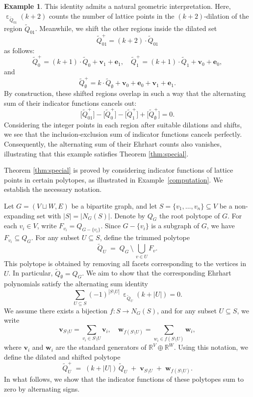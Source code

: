 \documentclass{amsart}
\theoremstyle{definition}
\newtheorem{example}[theorem]{Example}
\theoremstyle{remark}
\DeclareMathOperator{\ehr}{\varepsilon}
\numberwithin{equation}{section}
\begin{document}
\begin{example}
This identity admits a natural geometric interpretation. Here, $\ehr_{\widetilde{Q}_{01}}(k+2)$ counts the number of lattice points in the $(k+2)$-dilation of the region $\widetilde{Q}_{01}$. Meanwhile, we shift the other regions inside the dilated set
\[
\widetilde{Q}_{01}^+ = (k+2)\cdot\widetilde{Q}_{01}
\]
as follows:
\[
\widetilde{Q}_0^+ = (k+1)\cdot\widetilde{Q}_0 + \mathbf{v}_1 + \mathbf{e}_1,\quad
\widetilde{Q}_1^+ = (k+1)\cdot\widetilde{Q}_1 + \mathbf{v}_0 + \mathbf{e}_0,
\]
and
\[
\widetilde{Q}_\emptyset^+ = k\cdot\widetilde{Q}_\emptyset + \mathbf{v}_0 + \mathbf{e}_0 + \mathbf{v}_1 + \mathbf{e}_1.
\]
By construction, these shifted regions overlap in such a way that the alternating sum of their indicator functions cancels out:
\[
\bigl[\widetilde{Q}_{01}^+\bigr]-\bigl[\widetilde{Q}_0^+\bigr]-\bigl[\widetilde{Q}_1^+\bigr]+\bigl[\widetilde{Q}_\emptyset^+\bigr]=0.
\]
Considering the integer points in each region after suitable dilations and shifts, we see that the inclusion-exclusion sum of indicator functions cancels perfectly. Consequently, the alternating sum of their Ehrhart counts also vanishes, illustrating that this example satisfies Theorem \ref{thm:special}.

\end{example}


Theorem \ref{thm:special} is proved by considering indicator functions of lattice points in certain polytopes, as illustrated in Example~\ref{computation}. We establish the necessary notation.

Let $G = (V \sqcup W, E)$ be a bipartite graph, and let $S = \{v_1, \dots, v_n\} \subseteq V$ be a non-expanding set with $|S| = |N_G(S)|$. Denote by $Q_G$ the root polytope of $G$. For each $v_i \in V$, write $F_{v_i} = Q_{G - \{v_i\}}$. Since $G - \{v_i\}$ is a subgraph of $G$, we have $F_{v_i} \subseteq Q_G$. For any subset $U\subseteq S$, define the trimmed polytope
\[
  \widetilde{Q}_U 
  \;=\; 
  Q_G \,\setminus\, \bigcup_{v\in U}F_v.
\]
This polytope is obtained by removing all facets corresponding to the vertices in $U$. In particular, $\widetilde{Q}_\emptyset = Q_G$. We aim to show that the corresponding Ehrhart polynomials satisfy the alternating sum identity
\[
\sum_{U\subseteq S} (-1)^{|S\setminus U|}\,\ehr_{\widetilde{Q}_U}(k+|U|) = 0.
\]
We assume there exists a bijection $f : S \to N_G(S)$, and for any subset $U\subseteq S$, we write
\[
  \mathbf{v}_{S\setminus U} = \sum_{v_i \in S\setminus U} \mathbf{v}_i,
  \quad
  \mathbf{w}_{f(S\setminus U)} 
  = \sum_{w_i \in f(S\setminus U)} \mathbf{w}_i,
\]
where $\mathbf{v}_i$ and $\mathbf{w}_i$ are the standard generators of $\mathbb{R}^V \oplus \mathbb{R}^W$. Using this notation, we define the dilated and shifted polytope
\[
  \widetilde{Q}^+_U \;=\; 
  (k + |U|)\,\widetilde{Q}_U 
  \;+\;
  \mathbf{v}_{S\setminus U}
  \;+\;
  \mathbf{w}_{f(S\setminus U)}.
\]
In what follows, we show that the indicator functions of these polytopes sum to zero by alternating signs.
\end{document}
